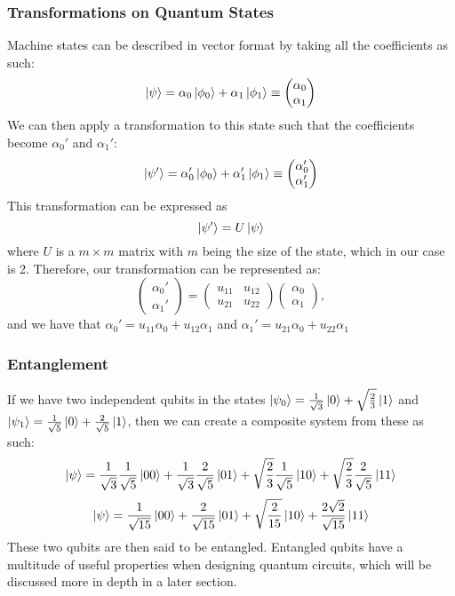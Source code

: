 \subsubsection{Transformations on Quantum States}
Machine states can be described in vector format by taking all the coefficients as such: $$\ket{\psi} = \alpha_0\ket{\phi_0} + \alpha_1\ket{\phi_1} \equiv \begin{pmatrix} \alpha_0 \\ \alpha_1 \end{pmatrix}$$ We can then apply a transformation to this state such that the coefficients become $\alpha_0'$ and $\alpha_1'$: $$\ket{\psi'} = \alpha_0'\ket{\phi_0} + \alpha_1'\ket{\phi_1} \equiv \begin{pmatrix} \alpha_0' \\ \alpha_1' \end{pmatrix}$$ This transformation can be expressed as $$\ket{\psi'} = U\ket{\psi}$$ where $U$ is a $m\times m$ matrix with $m$ being the size of the state, which in our case is 2. Therefore, our transformation can be represented as: $$\begin{pmatrix} \alpha_0' \\ \alpha_1' \end{pmatrix} = \begin{pmatrix} u_{11} & u_{12} \\ u_{21} & u_{22} \end{pmatrix} \begin{pmatrix} \alpha_0 \\ \alpha_1 \end{pmatrix},$$ and we have that $\alpha_0' = u_{11}\alpha_0 + u_{12}\alpha_1$ and $\alpha_1' = u_{21}\alpha_0 + u_{22}\alpha_1$
\subsubsection{Entanglement}
If we have two independent qubits in the states $\ket{\psi_0} = \frac{1}{\sqrt{3}}\ket{0} + \sqrt{\frac{2}{3}}\ket{1}$ and $\ket{\psi_1} = \frac{1}{\sqrt{5}}\ket{0} + \frac{2}{\sqrt{5}}\ket{1}$, then we can create a composite system from these as such:
$$
\ket{\psi} = \frac{1}{\sqrt{3}}\frac{1}{\sqrt{5}}\ket{00} + \frac{1}{\sqrt{3}}\frac{2}{\sqrt{5}}\ket{01} + \sqrt{\frac{2}{3}}\frac{1}{\sqrt{5}}\ket{10} + \sqrt{\frac{2}{3}}\frac{2}{\sqrt{5}}\ket{11} $$
$$\ket{\psi} = \frac{1}{\sqrt{15}}\ket{00} + \frac{2}{\sqrt{15}}\ket{01} + \sqrt{\frac{2}{15}}\ket{10} + \frac{2\sqrt{2}}{\sqrt{15}}\ket{11}$$
These two qubits are then said to be entangled. Entangled qubits have a multitude of useful properties when designing quantum circuits, which will be discussed more in depth in a later section.
